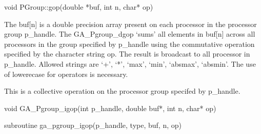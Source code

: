 \documentclass[12pt]{article}
\begin{document}
\begin{cxxapi}
\begin{cxxcode}
void PGroup::gop(double *buf, int n, char* op)
\end{cxxcode}
\begin{funcargs}
\end{funcargs}
\end{cxxapi}
\gcoll
\begin{desc}

The buf[n] is a double precision array present on each processor in the processor group p_handle. The GA_Pgroup_dgop `sums' all elements in buf[n] across all processors in the group specified by p_handle using the commutative operation specified by the character string op.  The result is broadcast to all processor in p_handle. Allowed strings are `+', `*', `max', `min', `absmax', `absmin'. The use of lowerecase for operators is necessary.

This is a collective operation on the processor group specifed by p_handle.
\end{desc}


\begin{capi}
\begin{ccode}
void GA_Pgroup_igop(int p_handle, double buf*, int n, char* op)
\end{ccode}
\begin{funcargs}
\end{funcargs}
\end{capi}

\begin{fapi}
\begin{fcode}
subroutine ga_pgroup_igop(p_handle, type, buf, n, op)
\end{fcode}
\begin{funcargs}
\end{funcargs}
\end{fapi}
\end{document}
